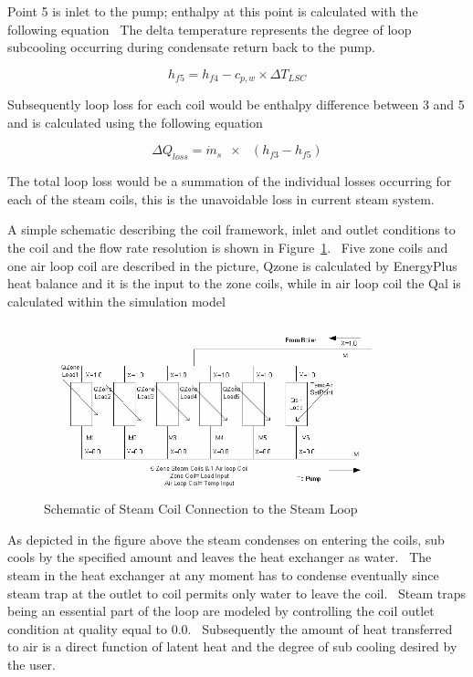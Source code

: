 Point 5 is inlet to the pump; enthalpy at this point is calculated with the following equation~ The delta temperature represents the degree of loop subcooling occurring during condensate return back to the pump.

\begin{equation}
{h_{f5}} = {h_{f4}} - {c_{p,w}} \times \Delta {T_{LSC}}
\end{equation}

Subsequently loop loss for each coil would be enthalpy difference between 3 and 5 and is calculated using the following equation

\begin{equation}
\Delta {Q_{loss}} = {\dot m_s}\,\,\, \times \,\,\,\,({h_{f3}} - {h_{f5}})
\end{equation}

The total loop loss would be a summation of the individual losses occurring for each of the steam coils, this is the unavoidable loss in current steam system.

A simple schematic describing the coil framework, inlet and outlet conditions to the coil and the flow rate resolution is shown in Figure~\ref{fig:schematic-of-steam-coil-connection-to}.~ Five zone coils and one air loop coil are described in the picture, Qzone is calculated by EnergyPlus heat balance and it is the input to the zone coils, while in air loop coil the Qal is calculated within the simulation model

\begin{figure}[hbtp] %
\centering
\includegraphics[width=0.9\textwidth, height=0.9\textheight, keepaspectratio=true]{media/image2032.png}
\caption{Schematic of Steam Coil Connection to the Steam Loop \protect \label{fig:schematic-of-steam-coil-connection-to}}
\end{figure}

As depicted in the figure above the steam condenses on entering the coils, sub cools by the specified amount and leaves the heat exchanger as water.~ The steam in the heat exchanger at any moment has to condense eventually since steam trap at the outlet to coil permits only water to leave the coil.~ Steam traps being an essential part of the loop are modeled by controlling the coil outlet condition at quality equal to 0.0.~ Subsequently the amount of heat transferred to air is a direct function of latent heat and the degree of sub cooling desired by the user.

